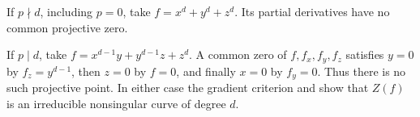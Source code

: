 If $p\nmid d$, including $p=0$, take $f=x^d+y^d+z^d$. Its partial derivatives have no common projective zero.

If $p\mid d$, take $f=x^{d-1}y+y^{d-1}z+z^d$. A common zero of $f,f_x,f_y,f_z$ satisfies $y=0$ by $f_z=y^{d-1}$, then $z=0$ by $f=0$, and finally $x=0$ by $f_y=0$. Thus there is no such projective point. In either case the gradient criterion and  show that $Z(f)$ is an irreducible nonsingular curve of degree $d$.
